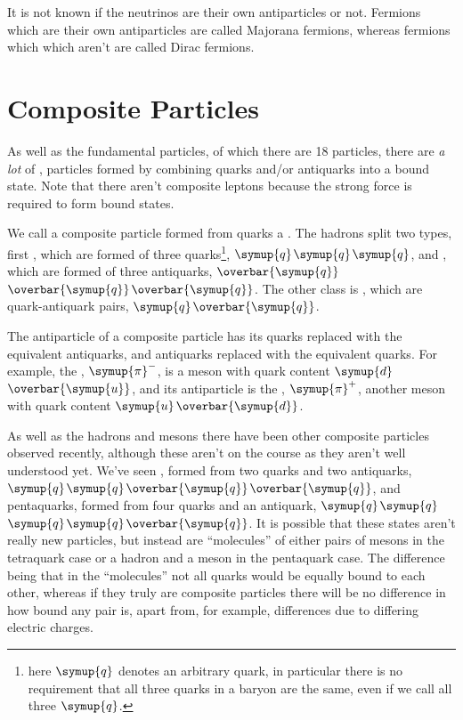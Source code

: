 \documentclass[fleqn]{NotesClass}
\newcommand{\Pparticle}[1]{\symup{#1}}
\newcommand{\Pu}{\ensuremath{\Pparticle{u}}}
\newcommand{\Pd}{\ensuremath{\Pparticle{d}}}
\newcommand{\Pq}{\ensuremath{\Pparticle{q}}}
\newcommand{\Ppip}{\ensuremath{\Pparticle{\pi}^{+}}}
\newcommand{\Ppim}{\ensuremath{\Pparticle{\pi}^{-}}}
\newcommand{\APantiparticle}[1]{\overbar{#1}}
\newcommand{\APu}{\ensuremath{\APantiparticle{\Pparticle{u}}}}
\newcommand{\APd}{\ensuremath{\APantiparticle{\Pparticle{d}}}}
\newcommand{\APq}{\ensuremath{\APantiparticle{\Pparticle{q}}}}
\begin{document}
    \begin{openquestion}{}{}
        It is not known if the neutrinos are their own antiparticles or not.
        Fermions which are their own antiparticles are called Majorana fermions, whereas fermions which which aren't are called Dirac fermions.
    \end{openquestion}
    
    \section{Composite Particles}
    As well as the fundamental particles, of which there are 18 particles, there are \emph{a lot} of , particles formed by combining quarks and/or antiquarks into a bound state.
    Note that there aren't composite leptons because the strong force is required to form bound states.
    
    We call a composite particle formed from quarks a .
    The hadrons split two types, first , which are formed of three quarks\footnote{here \Pq{} denotes an arbitrary quark, in particular there is no requirement that all three quarks in a baryon are the same, even if we call all three \Pq.}, \Pq\Pq\Pq, and , which are formed of three antiquarks, \APq\APq\APq.
    The other class is , which are quark-antiquark pairs, \Pq\APq.
    
    The antiparticle of a composite particle has its quarks replaced with the equivalent antiquarks, and antiquarks replaced with the equivalent quarks.
    For example, the , \Ppim\index{\Ppim|see{negative pion}}, is a meson with quark content \Pd\APu, and its antiparticle is the , \Ppip\index{\Ppip|see{positive pion}}, another meson with quark content \Pu\APd.
    
    As well as the hadrons and mesons there have been other composite particles observed recently, although these aren't on the course as they aren't well understood yet.
    We've seen , formed from two quarks and two antiquarks, \Pq\Pq\APq\APq, and pentaquarks, formed from four quarks and an antiquark, \Pq\Pq\Pq\Pq\APq.
    It is possible that these states aren't really new particles, but instead are \enquote{molecules} of either pairs of mesons in the tetraquark case or a hadron and a meson in the pentaquark case.
    The difference being that in the \enquote{molecules} not all quarks would be equally bound to each other, whereas if they truly are composite particles there will be no difference in how bound any pair is, apart from, for example, differences due to differing electric charges.
    
\end{document}
